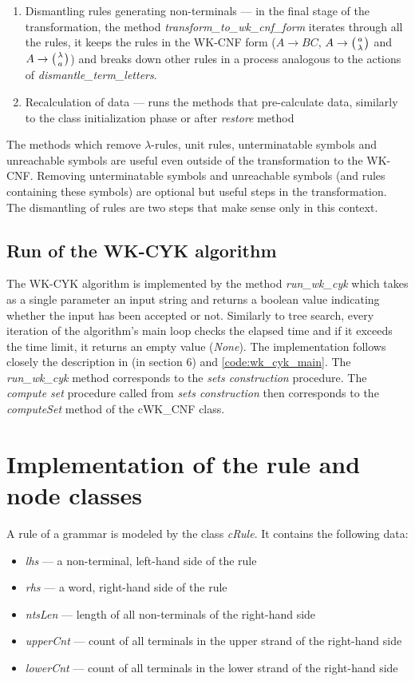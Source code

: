 \begin{enumerate}
  \item{Dismantling rules generating non-terminals --- in the final stage of the transformation, the method \textit{transform\_to\_wk\_cnf\_form} iterates through all the rules, it keeps the rules in the WK-CNF form ($A \rightarrow BC$, $A \rightarrow \wkpair{a}{\lambda}$ and $A \rightarrow \wkpair{\lambda}{a}$) and breaks down other rules in a process analogous to the actions of \textit{dismantle\_term\_letters}}.

  \item{Recalculation of data --- runs the methods that pre-calculate data, similarly to the class initialization phase or after \textit{restore} method}
\end{enumerate}

The methods which remove $\lambda$-rules, unit rules, unterminatable symbols and unreachable symbols are useful even outside of the transformation to the WK-CNF. Removing unterminatable symbols and unreachable symbols (and rules containing these symbols) are optional but useful steps in the transformation. The dismantling of rules are two steps that make sense only in this context.


\subsection{Run of the WK-CYK algorithm}
The WK-CYK algorithm is implemented by the method \textit{run\_wk\_cyk} which takes as a single parameter an input string and returns a boolean value indicating whether the input has been accepted or not. Similarly to tree search, every iteration of the algorithm's main loop checks the elapsed time and if it exceeds the time limit, it returns an empty value (\textit{None}). The implementation follows closely the description in \cite{WK_CYK} (in section 6) and \ref{code:wk_cyk_main}. The \textit{run\_wk\_cyk} method corresponds to the \textit{sets construction} procedure. The \textit{compute set} procedure called from \textit{sets construction} then corresponds to the \textit{computeSet} method of the cWK\_CNF class.


\section{Implementation of the rule and node classes} \label{section:cRule_cNode}
A rule of a grammar is modeled by the class \textit{cRule}. It contains the following data:
\begin{itemize}
  \item{\textit{lhs} --- a non-terminal, left-hand side of the rule}
  \item{\textit{rhs} --- a word, right-hand side of the rule}
  \item{\textit{ntsLen} --- length of all non-terminals of the right-hand side}
  \item{\textit{upperCnt} --- count of all terminals in the upper strand of the right-hand side}
  \item{\textit{lowerCnt} --- count of all terminals in the lower strand of the right-hand side}
\end{itemize}

